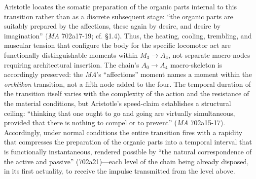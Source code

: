 \documentclass{article}
\begin{document}
Aristotle locates the somatic preparation of the organic parts internal to this transition rather than as a discrete subsequent stage: ``the organic parts are suitably prepared by the affections, these again by desire, and desire by imagination'' (\textit{MA} 702a17-19; cf. \S 1.4). Thus, the heating, cooling, trembling, and muscular tension that configure the body for the specific locomotor act are functionally distinguishable moments within $M_3 \rightarrow A_4$, not separate macro-nodes requiring architectural insertion. The chain's $A_0 \rightarrow A_4$ macro-skeleton is accordingly preserved: the \textit{MA}'s ``affections'' moment names a moment within the \textit{orektikon} transition, not a fifth node added to the four. The temporal duration of the transition itself varies with the complexity of the action and the resistance of the material conditions, but Aristotle's speed-claim establishes a structural ceiling: ``thinking that one ought to go and going are virtually simultaneous, provided that there is nothing to compel or to prevent'' (\textit{MA} 702a15-17). Accordingly, under normal conditions the entire transition fires with a rapidity that compresses the preparation of the organic parts into a temporal interval that is functionally instantaneous, rendered possible by ``the natural correspondence of the active and passive'' (702a21)---each level of the chain being already disposed, in its first actuality, to receive the impulse transmitted from the level above.
\end{document}
